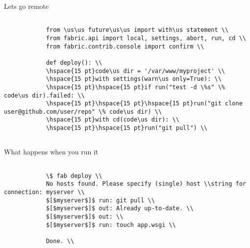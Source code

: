 \documentclass[xcolor=dvipsnames]{beamer}
\def\us{\char`\_}
\begin{document}
    \begin{frame}{Lets go remote}
        \begin{verbatim}

            from \us\us future\us\us import with\us statement \\
            from fabric.api import local, settings, abort, run, cd \\
            from fabric.contrib.console import confirm \\

            def deploy(): \\
            \hspace{15 pt}code\us dir = '/var/www/myproject' \\
            \hspace{15 pt}with settings(warn\us only=True): \\
            \hspace{15 pt}\hspace{15 pt}if run("test -d \%s" \% code\us dir).failed: \\
            \hspace{15 pt}\hspace{15 pt}\hspace{15 pt}run("git clone user@github.com/user/repo" \% code\us dir) \\
            \hspace{15 pt}with cd(code\us dir): \\
            \hspace{15 pt}\hspace{15 pt}run("git pull") \\
            
        \end{verbatim}
    \end{frame}

    \begin{frame}{What happens when you run it}
        \begin{verbatim}
    
            \$ fab deploy \\
            No hosts found. Please specify (single) host \\string for connection: myserver \\
            $[$myserver$]$ run: git pull \\
            $[$myserver$]$ out: Already up-to-date. \\
            $[$myserver$]$ out: \\
            $[$myserver$]$ run: touch app.wsgi \\

            Done. \\

        \end{verbatim}
    \end{frame}
\end{document}

